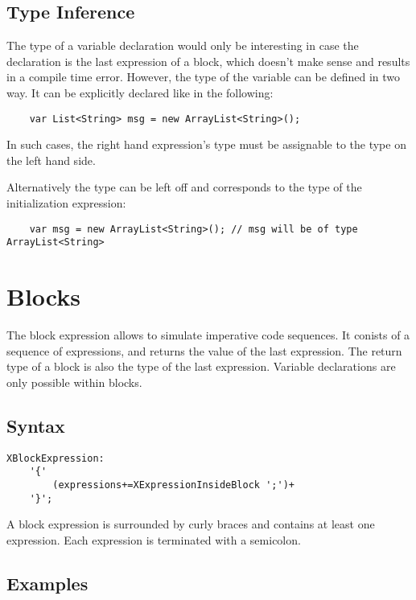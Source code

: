 \documentclass[a4paper,10pt]{scrreprt}
\begin{document}
\subsection{Type Inference}
The type of a variable declaration would only be interesting in case the declaration is the last expression of a block, which doesn't make sense and results in a compile time error.
However, the type of the variable can be defined in two way. It can be explicitly declared like in the following:
\begin{lstlisting}
	var List<String> msg = new ArrayList<String>(); 

\end{lstlisting}

In such cases, the right hand expression's type must be assignable to the type on the left hand side. 

Alternatively the type can be left off and corresponds to the type of the initialization expression:  
\begin{lstlisting}
	var msg = new ArrayList<String>(); // msg will be of type ArrayList<String>  

\end{lstlisting}







\section{Blocks\label{Blocks}}
The block expression allows to simulate imperative code sequences. It conists of a sequence of expressions, and returns the value of the last expression.
The return type of a block is also the type of the last expression. 
Variable declarations are only possible within blocks.

\subsection{Syntax}
\begin{lstlisting}
XBlockExpression:
	'{'
		(expressions+=XExpressionInsideBlock ';')+
	'}';

\end{lstlisting}
 

A block expression is surrounded by curly braces and contains at least one expression. Each expression is terminated with a semicolon.




\subsection{Examples}
\end{document}
